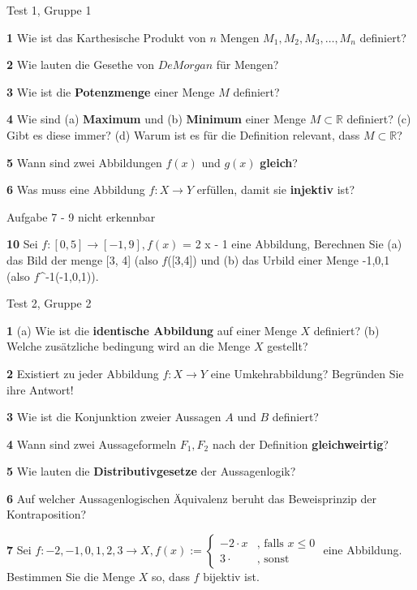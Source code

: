 \documentclass[11pt]{article}
\begin{document}
Test 1, Gruppe 1

    \textbf{1} Wie ist das Karthesische Produkt von $n$ Mengen $M_1, M_2, M_3, \dots, M_n$ definiert?

    \textbf{2} Wie lauten die Gesethe von $De Morgan$ für Mengen?

    \textbf{3} Wie ist die \textbf{Potenzmenge} einer Menge $M$ definiert?

    \textbf{4} Wie sind (a) \textbf{Maximum} und (b) \textbf{Minimum} einer Menge $M \subset \mathbb{R}$ definiert? (c) Gibt es diese immer? (d) Warum ist es für die Definition relevant, dass $M \subset \mathbb{R}$?

    \textbf{5} Wann sind zwei Abbildungen $f(x)$ und $g(x)$ \textbf{gleich}?

    \textbf{6} Was muss eine Abbildung $f : X \rightarrow Y $ erfüllen, damit sie \textbf{injektiv} ist?

    Aufgabe 7 - 9 nicht erkennbar

    \textbf{10} Sei $f : [0,5] \rightarrow [-1,9], f(x)$ = 2 \cdot x - 1 eine Abbildung, Berechnen Sie (a) das Bild der menge [3, 4] (also $f$([3,4]) und (b) das Urbild einer Menge {-1,0,1} (also $f$^{-1}({-1,0,1})).

Test 2, Gruppe 2

    \textbf{1} (a) Wie ist die \textbf{identische Abbildung} auf einer Menge $X$ definiert? (b) Welche zusätzliche bedingung wird an die Menge $X$ gestellt?

    \textbf{2} Existiert zu jeder Abbildung $f : X \rightarrow Y $ eine Umkehrabbildung? Begründen Sie ihre Antwort!

    \textbf{3} Wie ist die Konjunktion zweier Aussagen $A$ und $B$ definiert?

    \textbf{4} Wann sind zwei Aussageformeln $F_1, F_2$ nach der Definition \textbf{gleichweirtig}?

    \textbf{5} Wie lauten die \textbf{Distributivgesetze} der Aussagenlogik?

    \textbf{6} Auf welcher Aussagenlogischen Äquivalenz beruht das Beweisprinzip der Kontraposition?

    \textbf{7} Sei $f : {-2,-1,0,1,2,3} \rightarrow X, f(x) :=  \begin{cases}
                                                                    -2 \cdot x & \text{, falls $x \leq 0$} \\
                                                                    3 \cdot & \text{, sonst}
    \end{cases}$ eine Abbildung. Bestimmen Sie die Menge $X$ so, dass $f$ bijektiv ist.
\end{document}
